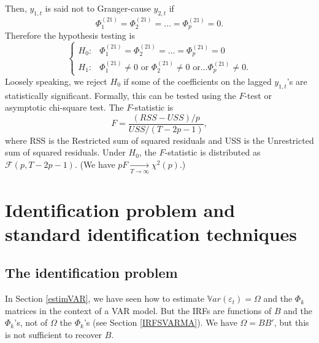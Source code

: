\documentclass[
  12pt,
]{book}
\theoremstyle{definition}
\theoremstyle{definition}
\theoremstyle{definition}
\theoremstyle{definition}
\theoremstyle{remark}
\begin{document}
Then, \(y_{1,t}\) is said not to Granger-cause \(y_{2,t}\) if
\[
\Phi_1^{(21)}=\Phi_2^{(21)}=\ldots=\Phi_p^{(21)}=0.
\]
Therefore the hypothesis testing is
\[
\begin{cases}
H_{0}: & \Phi_1^{(21)}=\Phi_2^{(21)}=\ldots=\Phi_p^{(21)}=0\\
H_{1}: & \Phi_1^{(21)}\neq0\mbox{ or }\Phi_2^{(21)}\neq0\mbox{ or}\ldots\Phi_p^{(21)}\neq0.\end{cases}
\]
Loosely speaking, we reject \(H_{0}\) if some of the coefficients on the lagged \(y_{1,t}\)'s are statistically significant. Formally, this can be tested using the \(F\)-test or asymptotic chi-square test. The \(F\)-statistic is
\[
F=\frac{(RSS-USS)/p}{USS/(T-2p-1)},
\]
where RSS is the Restricted sum of squared residuals and USS is the Unrestricted sum of squared residuals. Under \(H_{0}\), the \(F\)-statistic is distributed as \(\mathcal{F}(p,T-2p-1)\). (We have \(pF\underset{T \rightarrow \infty}{\rightarrow}\chi^{2}(p)\).)

\hypertarget{identifStruct}{%
\chapter{Identification problem and standard identification techniques}\label{identifStruct}}

\hypertarget{IdentifPbm}{%
\section{The identification problem}\label{IdentifPbm}}

In Section \ref{estimVAR}, we have seen how to estimate \(\mathbb{V}ar(\varepsilon_t) =\Omega\) and the \(\Phi_k\) matrices in the context of a VAR model. But the IRFs are functions of \(B\) and the \(\Phi_k\)'s, not of \(\Omega\) the \(\Phi_k\)'s (see Section \ref{IRFSVARMA}). We have \(\Omega = BB'\), but this is not sufficient to recover \(B\).
\end{document}
